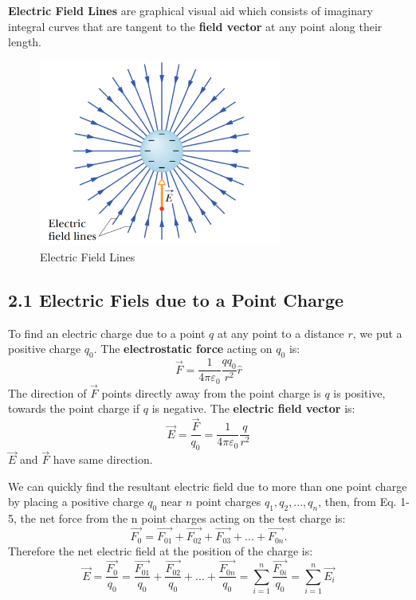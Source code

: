 \documentclass[12pt, a4paper]{article}
\begin{document}
		\textbf{Electric Field Lines} are graphical visual aid which consists of imaginary integral curves that are tangent to the \textbf{field vector} at any point along their length.
		
		\begin{figure}[ht]
			\centering
			\includegraphics[width=8cm]{Physics2_PNGs/elec-field-lines.png}
			\caption{Electric Field Lines}
			\label{fig:electric-field-lines}
		\end{figure}
		
		
		\subsection*{2.1 Electric Fiels due to a Point Charge}
		To find an electric charge due to a point $q$ at any point to a distance $r$, we put a positive charge $q_0$. The \textbf{electrostatic force} acting on $q_0$ is:
		\begin{equation*}
			\vec{F} = \frac{1}{4\pi\varepsilon_0} \frac{q q_0}{r^2} \hat{r} 
		\end{equation*}
		The direction of $\vec{F}$ points directly away from the point charge is $q$ is positive, towards the point charge if $q$ is negative.
		The \textbf{electric field vector} is:
		\begin{equation*}
			\vec{E} = \frac{\vec{F}}{q_0} = \frac{1}{4\pi\varepsilon_0} \frac{q}{r^2} \tag{Point Charge, 2-2}
		\end{equation*}	
		$\vec{E}$ and $\vec{F}$ have same direction.
		
		We can quickly find the resultant electric field due to more than one point
		charge by placing a positive charge $q_0$ near $n$ point charges $q_1, q_2, . . . , q_n$, then,
		from Eq. 1-5, the net force from the n point charges acting on the test charge is:
		\begin{equation*}
			\vec{F_{0}} = \vec{F_{01}} + \vec{F_{02}} + \vec{F_{03}} + ... + \vec{F_{0n}}.
		\end{equation*}
		Therefore the net electric field at the position of the charge is:
		\begin{equation*}
			\vec{E} = \frac{\vec{F_0}}{q_0} = \frac{\vec{F_{01}}}{q_0} + \frac{\vec{F_{02}}}{q_0} + ... + \frac{\vec{F_{0n}}}{q_0} = \sum_{i=1}^{n} \frac{\vec{F_{0i}}}{q_0} = \sum_{i=1}^{n} \vec{E_i} \tag{2-3}
		\end{equation*}
	
\end{document}
